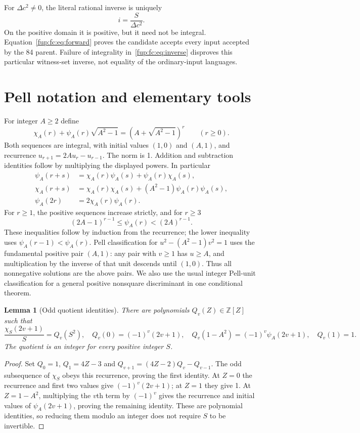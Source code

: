 \documentclass[11pt,letterpaper]{article}
\newtheorem{lemma}[theorem]{Lemma}
\theoremstyle{definition}\newtheorem{definition}[theorem]{Definition}
\theoremstyle{remark}\newtheorem{remark}[theorem]{Remark}
\newcommand{\D}{\Delta}
\newcommand{\ch}[2]{\chi_{#1}(#2)}\newcommand{\ps}[2]{\psi_{#1}(#2)}
\begin{document}
For $\D c^2\ne0$, the literal rational inverse is uniquely
\begin{equation}
 i=\frac{S}{\D c^2}.\label{fup:fc:eq:inverse}
\end{equation}
On the positive domain it is positive, but it need not be integral.
Equation~\eqref{fup:fc:eq:forward} proves the candidate accepts every input
accepted by the 84 parent. Failure of integrality in~\eqref{fup:fc:eq:inverse}
disproves this particular witness-set inverse, not equality of the
ordinary-input languages.

\section{Pell notation and elementary tools}
For integer $A\ge2$ define
\[
 \ch A r+\ps A r\sqrt{A^2-1}
  =(A+\sqrt{A^2-1})^r\qquad(r\ge0).
\]
Both sequences are integral, with initial values $(1,0)$ and $(A,1)$,
and recurrence $u_{r+1}=2Au_r-u_{r-1}$. The norm is 1. Addition and
subtraction identities follow by multiplying the displayed powers.
In particular
\begin{align}
 \ps A {r+s}&=\ch A r\ps A s+\ps A r\ch A s,\\
 \ch A {r+s}&=\ch A r\ch A s+(A^2-1)\ps A r\ps A s,\\
 \ps A {2r}&=2\ch A r\ps A r.\label{fup:fc:eq:dup}
\end{align}
For $r\ge1$, the positive sequences increase strictly, and for $r\ge3$
\begin{equation}
 (2A-1)^{r-1}\le\ps A r<(2A)^{r-1}.\label{fup:fc:eq:growth}
\end{equation}
These inequalities follow by induction from the recurrence; the lower
inequality uses $\ps A {r-1}<\ps A r$. Pell classification for
$u^2-(A^2-1)v^2=1$ uses the fundamental positive pair $(A,1)$: any pair
with $v\ge1$ has $u\ge A$, and multiplication by the inverse of that
unit descends until $(1,0)$. Thus all nonnegative solutions are the above
pairs. We also use the usual integer Pell-unit classification for a
general positive nonsquare discriminant in one conditional theorem.

\begin{lemma}[Odd quotient identities]\label{fup:fc:lem:quotient}
There are polynomials $Q_v(Z)\in\mathbb Z[Z]$ such that
\[
 \frac{\ch S {2v+1}}S=Q_v(S^2),\quad
 Q_v(0)=(-1)^v(2v+1),\quad
 Q_v(1-A^2)=(-1)^v\ps A {2v+1},\quad Q_v(1)=1.
\]
The quotient is an integer for every positive integer $S$.
\end{lemma}
\begin{proof}
Set $Q_0=1$, $Q_1=4Z-3$ and
$Q_{v+1}=(4Z-2)Q_v-Q_{v-1}$. The odd subsequence of $\chi_S$ obeys
this recurrence, proving the first identity. At $Z=0$ the recurrence
and first two values give $(-1)^v(2v+1)$; at $Z=1$ they give 1.
At $Z=1-A^2$, multiplying the $v$th term by $(-1)^v$ gives the recurrence
and initial values of $\psi_A(2v+1)$, proving the remaining identity.
These are polynomial identities, so reducing them modulo an integer
does not require $S$ to be invertible.
\end{proof}
\end{document}
